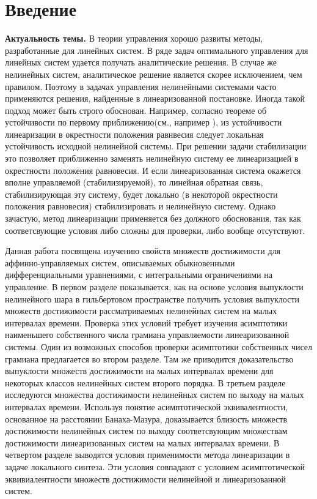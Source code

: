 \documentclass[../main.tex]{subfiles}
\begin{document}
\clearpage
\section*{Введение}
\textbf{Актуальность темы.} В теории управления хорошо развиты методы, разработанные для линейных систем. В ряде задач оптимального управления для линейных систем удается получать аналитические решения. В случае же нелинейных систем, аналитическое решение является скорее исключением, чем правилом. Поэтому в задачах управления нелинейными системами часто применяются решения, найденные в линеаризованной постановке. Иногда такой подход может быть строго обоснован. Например, согласно теореме об устойчивости по первому приближению(см., например \cite{Barbashin_book}), из устойчивости линеаризации в окрестности положения равнвесия следует локальная устойчивость исходной нелинейной системы. При решении задачи стабилизации это позволяет приближенно заменять нелинейную систему ее линеаризацией в окрестности положения равновесия. И если линеаризованная система окажется вполне управляемой (стабилизируемой), то линейная обратная связь, стабилизирующая эту систему, будет локально (в некоторой окрестности положения равновесия) стабилизировать и нелинейную систему\cite{Kras_add, Stab_lectures, Khalil, Polyak_book}.  Однако зачастую, метод линеаризации применяется без должного обоснования, так как соответсвующие условия либо сложны для проверки, либо вообще отсутствуют.

Данная работа посвящена изучению свойств множеств достижимости для аффинно-управляемых систем, описываемых обыкновенными дифференциальными уравнениями, с интегральными ограничениями на управление. В первом разделе показывается, как на основе условия выпуклости нелинейного шара в гильбертовом пространстве получить условия выпуклости множеств достижимости рассматриваемых нелинейных систем на малых интервалах времени. Проверка этих условий требует изучения асимптотики наименьшего собственного числа грамиана управляемости линеаризованной системы. Один из возможных способов проверки асимптотики собственных чисел грамиана предлагается во втором разделе. Там же приводится доказательство выпуклости множеств достижимости на малых интервалах времени для некоторых классов нелинейных систем второго порядка. В третьем разделе исследуются множества достижимости нелинейных систем по выходу на малых интервалах времени. Используя понятие асимптотической эквивалентности\cite{Ovs}, основанное на расстоянии Банаха-Мазура, доказывается близость множеств достижимости нелинейных систем по выходу соответсвующим множествам достижимости линеаризованных систем на малых интервалах времени. В четвертом разделе выводятся условия применимости метода линеаризации в задаче локального синтеза. Эти условия совпадают с условием асимптотической эквивиалентности множеств достижимости нелинейной и линеаризованной систем.
\end{document}
